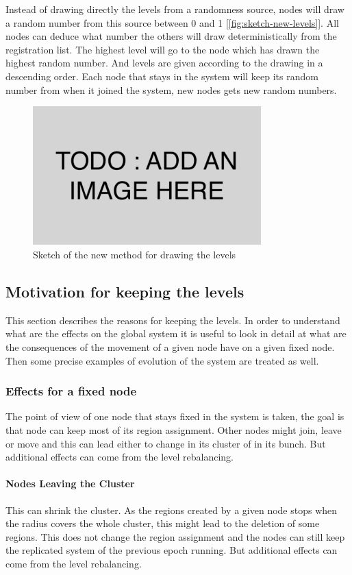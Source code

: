 \documentclass[a4paper,11pt,oneside]{report}
\begin{document}
Instead of drawing directly the levels from a randomness source, nodes will
draw a random number from this source between 0 and 1
[\autoref{fig:sketch-new-levels}].  All nodes can deduce what number the others
will draw deterministically from the registration list.  The highest level will
go to the node which has drawn the highest random number.  And levels are given
according to the drawing in a descending order.  Each node that stays in the
system will keep its random number from when it joined the system, new nodes
gets new random numbers. 

\begin{figure}[!h] 
\centering
\includegraphics[width=250pt]{figures/todo}
\caption{Sketch of the new method for drawing the levels}
\label{fig:sketch-new-levels}
\end{figure}


\subsection{Motivation for keeping the levels}
This section describes the reasons for keeping the levels. In order to
understand what are the effects on the global system it is useful to look in
detail at what are the consequences of the movement of a given node have on a
given fixed node. Then some precise examples of evolution of the system are
treated as well. 

\subsubsection{Effects for a fixed node} 
The point of view of one node that stays fixed in the system is taken, the goal
is that node can keep most of its region assignment.  Other nodes might
join, leave or move and this can lead either to change in its cluster of in its
bunch. But additional effects can come from the level rebalancing. 

\paragraph{Nodes Leaving the Cluster} 
This can shrink the cluster. As the regions created by a given node stops when
the radius covers the whole cluster, this might lead to the deletion of some
regions. This does not change the
region assignment and the nodes can still keep the replicated system of the
previous epoch running. But additional effects can come from the level rebalancing. 
\end{document}
